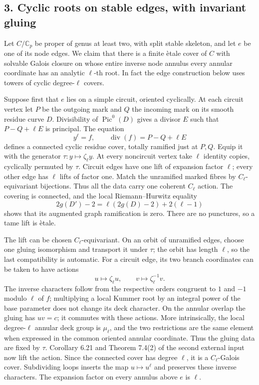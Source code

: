 \subsection*{3. Cyclic roots on stable edges, with invariant gluing}

Let $C/\mathbb C_p$ be proper of genus at least two, with split stable
skeleton, and let $e$ be one of its node edges.  We claim that there
is a finite \`etale cover of $C$ with solvable Galois closure on whose
entire inverse node annulus every annular coordinate has an analytic
$\ell$-th root.  In fact the edge construction below uses towers
of cyclic degree-$\ell$ covers.

Suppose first that $e$ lies on a simple circuit, oriented cyclically.
At each circuit vertex let $P$ be the outgoing mark and $Q$ the
incoming mark on its smooth residue curve $D$.  Divisibility of
$\operatorname{Pic}^0(D)$ gives a divisor $E$ such that
$P-Q+\ell E$ is principal.  The equation
\[
                          y^\ell=f,
       \qquad \operatorname{div}(f)=P-Q+\ell E
\]
defines a connected cyclic residue cover, totally ramified just at
$P,Q$.  Equip it with the generator $\tau:y\mapsto\zeta_\ell y$.
At every noncircuit vertex take $\ell$ identity copies, cyclically
permuted by $\tau$.  Circuit edges have one lift of expansion factor
$\ell$; every other edge has $\ell$ lifts of factor one.  Match the
unramified marked fibres by $C_\ell$-equivariant bijections.  Thus all
the data carry one coherent $C_\ell$ action.  The covering is
connected, and the local Riemann--Hurwitz equality
\[
  2g(D')-2=\ell(2g(D)-2)+2(\ell-1)
\]
shows that its augmented graph ramification is zero.  There are no
punctures, so a tame lift is \`etale.

The lift can be chosen $C_\ell$-equivariant.  On an orbit of
unramified edges, choose one gluing isomorphism and transport it
under $\tau$; the orbit has length $\ell$, so the last compatibility
is automatic.  For a circuit edge, its two branch coordinates can
be taken to have actions
\[
              u\longmapsto\zeta_\ell u,
       \qquad v\longmapsto\zeta_\ell^{-1}v.
\]
The inverse characters follow from the respective orders congruent
to $1$ and $-1$ modulo $\ell$ of $f$; multiplying a local Kummer
root by an integral power of the base parameter does not change
its deck character.  On the annular overlap the gluing has $uv=c$;
it commutes with these actions.  More intrinsically, the local
degree-$\ell$ annular deck group is $\mu_\ell$, and the two
restrictions are the same element when expressed in the common
oriented annular coordinate.  Thus the gluing data are fixed by
$\tau$.  Corollary 6.21 and Theorem 7.4(2) of the second external
input now lift the action.  Since the connected cover has degree
$\ell$, it is a $C_\ell$-Galois cover.  Subdividing loops inserts
the map $u\mapsto u^\ell$ and preserves these inverse characters.
The expansion factor on every annulus above $e$ is $\ell$.

